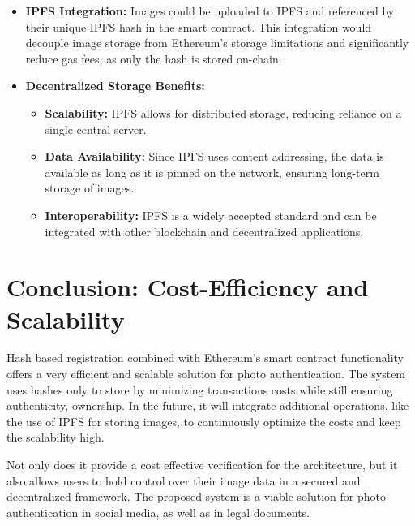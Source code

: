 \begin{itemize}
    \item {\textbf{IPFS Integration:}} Images could be uploaded to IPFS and referenced by their unique IPFS hash in the smart contract. This integration would decouple image storage from Ethereum's storage limitations and significantly reduce gas fees, as only the hash is stored on-chain.
    \item {\textbf{Decentralized Storage Benefits:}}
        \begin{itemize}
            \item \textbf{Scalability:} IPFS allows for distributed storage, reducing reliance on a single central server.
            \item \textbf{Data Availability:} Since IPFS uses content addressing, the data is available as long as it is pinned on the network, ensuring long-term storage of images.
            \item \textbf{Interoperability:} IPFS is a widely accepted standard and can be integrated with other blockchain and decentralized applications.
        \end{itemize}
\end{itemize}

\section{Conclusion: Cost-Efficiency and Scalability}
Hash based registration combined with Ethereum’s smart contract functionality offers a very efficient and scalable solution for photo authentication. 
The system uses hashes only to store by minimizing transactions costs while still ensuring authenticity, ownership. In the future, it will integrate additional operations, like the use of IPFS for storing images, to continuously optimize the costs and keep the scalability high.

Not only does it provide a cost effective verification for the architecture, but it also allows users to hold control over their image data in a secured and decentralized framework. The proposed system is a viable solution for photo authentication in social media, as well as in legal documents.
